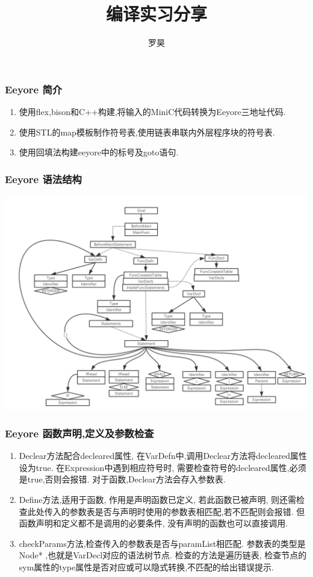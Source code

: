 \documentclass{beamer}
\author{罗昊}
\title{编译实习分享}
\institute{https://github.com/vangohao/hcc}
\begin{document}
 
\frame{\titlepage}
 
\begin{frame}[c]\frametitle{Eeyore 简介}
\begin{enumerate}
\item 使用flex,bison和C++构建,将输入的MiniC代码转换为Eeyore三地址代码.
\item 使用STL的map模板制作符号表,使用链表串联内外层程序块的符号表.
\item 使用回填法构建eeyore中的标号及goto语句.
\end{enumerate}
\end{frame}
\begin{frame}[c]\frametitle{Eeyore 语法结构}
\includegraphics[width=\linewidth]{bnf} 
\end{frame}
\begin{frame}[c]\frametitle{Eeyore 函数声明,定义及参数检查}
\begin{enumerate}[(1)]
\item Declear方法配合decleared属性, 在VarDefn中,调用Declear方法将decleared属性设为true. 在Expression中遇到相应符号时, 需要检查符号的decleared属性,必须是true,否则会报错. 对于函数,Declear方法会存入参数表.
\item Define方法,适用于函数, 作用是声明函数已定义, 若此函数已被声明, 则还需检查此处传入的参数表是否与声明时使用的参数表相匹配,若不匹配则会报错. 但函数声明和定义都不是调用的必要条件, 没有声明的函数也可以直接调用.
\item checkParams方法,检查传入的参数表是否与paramList相匹配. 参数表的类型是Node* ,也就是VarDecl对应的语法树节点. 检查的方法是遍历链表, 检查节点的sym属性的type属性是否对应或可以隐式转换,不匹配的给出错误提示.
\end{enumerate}
\end{frame}
\end{document}
